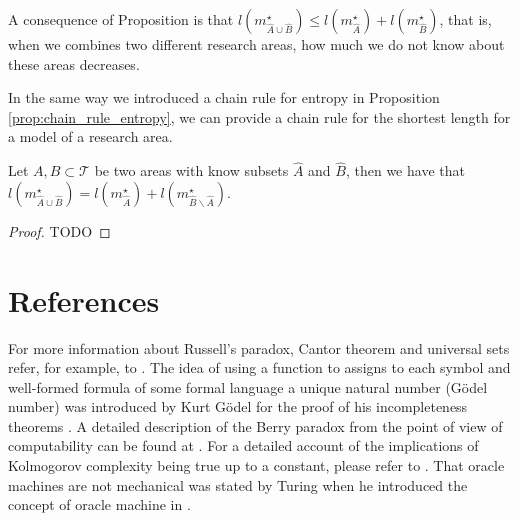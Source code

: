 A consequence of Proposition \label{prop:areas_union} is that $l \left( m_{\hat{A} \cup \hat{B}}^{\star} \right) \leq l \left( m_{\hat{A}}^{\star} \right) + l \left( m_{\hat{B}}^{\star} \right)$, that is, when we combines two different research areas, how much we do not know about these areas decreases.

In the same way we introduced a chain rule for entropy in Proposition \ref{prop:chain_rule_entropy}, we can provide a chain rule for the shortest length for a model of a research area.

\begin{proposition}
Let $A, B \subset \mathcal{T}$ be two areas with know subsets $\hat{A}$ and $\hat{B}$, then we have that $l \left( m_{\hat{A} \cup \hat{B}}^{\star} \right) = l \left( m_{\hat{A}}^{\star} \right) + l \left( m_{\hat{B} \backslash \hat{A}}^{\star} \right)$.
\end{proposition}
\begin{proof}
{\color{red} TODO}
\end{proof}

%
%

\section*{References}

For more information about Russell's paradox, Cantor theorem and universal sets refer, for example, to \cite{jech2013set}. The idea of using a function to assigns to each symbol and well-formed formula of some formal language a unique natural number (Gödel number) was introduced by Kurt Gödel for the proof of his incompleteness theorems \cite{godel1931formal}. A detailed description of the Berry paradox from the point of view of computability can be found at \cite{chaitin1995berry}. For a detailed account of the implications of Kolmogorov complexity being true up to a constant, please refer to \cite{li2013introduction}. That oracle machines are not mechanical was stated by Turing when he introduced the concept of oracle machine in \cite{turing1939systems}.



